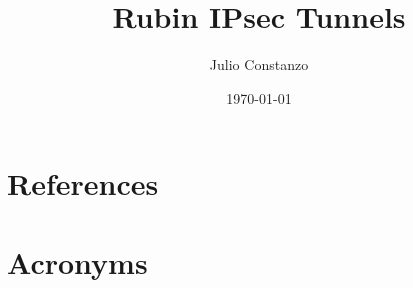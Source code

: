 \documentclass[PMO,authoryear,toc,lsstdraft]{lsstdoc}
\title{Rubin IPsec Tunnels}
\author{%
Julio Constanzo
}
\date{\today}
\begin{document}
\maketitle








\appendix
\section{References} \label{sec:bib}
\renewcommand{\refname}{} %


\section{Acronyms} \label{sec:acronyms}

\end{document}
